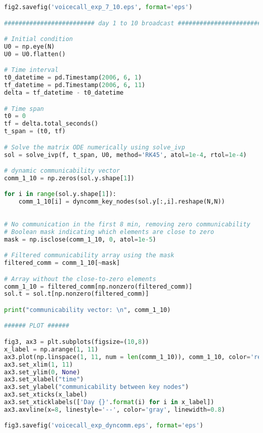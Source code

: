 \begin{lstlisting}[language=Python, caption=Second synthetic experiment]
fig2.savefig('voicecall_exp_7_10.eps', format='eps')

######################### day 1 to 10 broadcast #########################

# Initial condition 
U0 = np.eye(N)
U0 = U0.flatten()

# Time interval 
t0_datetime = pd.Timestamp(2006, 6, 1)
tf_datetime = pd.Timestamp(2006, 6, 11)
delta = tf_datetime - t0_datetime

# Time span
t0 = 0
tf = delta.total_seconds() 
t_span = (t0, tf) 

# Solve the matrix ODE numerically using solve_ivp
sol = solve_ivp(f, t_span, U0, method='RK45', atol=1e-4, rtol=1e-4)

# dynamic communicability vector
comm_1_10 = np.zeros(sol.y.shape[1])

for i in range(sol.y.shape[1]):
    comm_1_10[i] = dyncomm_key_nodes(sol.y[:,i].reshape(N,N))
    
    
# No communication in the first 8 min, removing zero communicability
# Boolean mask indicating which elements are close to zero
mask = np.isclose(comm_1_10, 0, atol=1e-5)

# Filtered communicability array using the mask
filtered_comm = comm_1_10[~mask]

# Array without the close-to-zero elements
comm_1_10 = filtered_comm[np.nonzero(filtered_comm)]
sol.t = sol.t[np.nonzero(filtered_comm)]

print("communicability vector: \n", comm_1_10)

###### PLOT ######

fig3, ax3 = plt.subplots(figsize=(10,8))
x_label = np.arange(1, 11)
ax3.plot(np.linspace(1, 11, num = len(comm_1_10)), comm_1_10, color='red')
ax3.set_xlim(1, 11)
ax3.set_ylim(0, None)
ax3.set_xlabel("time")
ax3.set_ylabel("communicability between key nodes")
ax3.set_xticks(x_label)
ax3.set_xticklabels(['Day {}'.format(i) for i in x_label])
ax3.axvline(x=8, linestyle='--', color='gray', linewidth=0.8)

fig3.savefig('voicecall_exp_dyncomm.eps', format='eps')
\end{lstlisting}